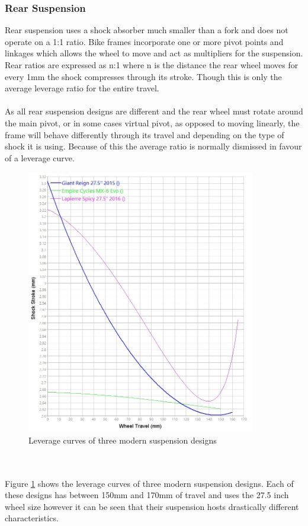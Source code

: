 	\subsubsection{Rear Suspension}
		Rear suspension uses a shock absorber much smaller than a \gls{fork} and does not operate on a 1:1 ratio. Bike frames incorporate one or more pivot points and linkages which allows the wheel to move and act as multipliers for the suspension. Rear ratios are expressed as n:1 where n is the distance the rear wheel moves for every 1mm the shock compresses through its stroke. Though this is only the average leverage ratio for the entire travel.
		\\\\
		As all rear suspension designs are different and the rear wheel must rotate around the main pivot, or in some cases virtual pivot, as opposed to moving linearly, the frame will behave differently through its travel and depending on the type of \gls{shock} it is using. Because of this the average ratio is normally dismissed in favour of a leverage curve.
		\begin{figure}[h!]
			\centering
			\includegraphics[width=10cm]{../images/3_bike_lev_ratio.jpg}
			\caption{Leverage curves of three modern suspension designs}
			\label{fig:3_bike_lev_ratio}
		\end{figure}
		\\\\
		Figure \ref{fig:3_bike_lev_ratio} shows the leverage curves of three modern suspension designs. Each of these designs has between 150mm and 170mm of travel and uses the 27.5 inch wheel size however it can be seen that their suspension hosts drastically different characteristics. 

